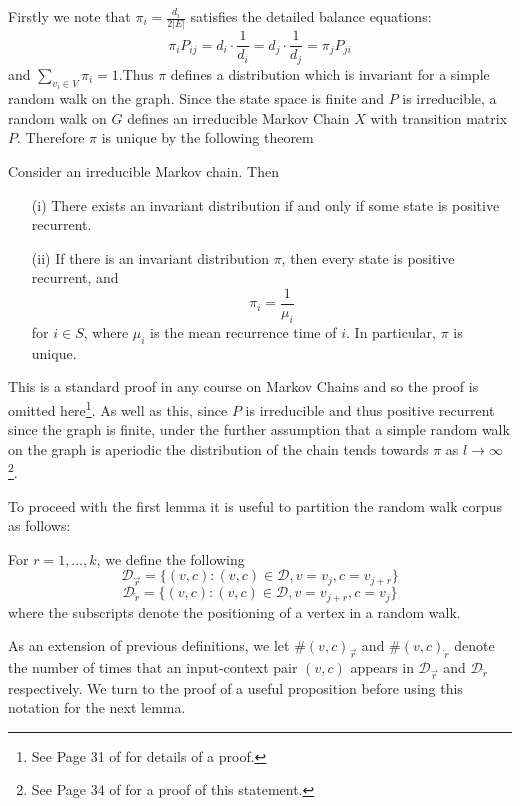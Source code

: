 \documentclass[a4paper]{article}
\newcommand{\D}{\mathcal D}
\newcommand{\rar}{\overrightarrow r}
\newcommand{\lar}{\overleftarrow r}
\begin{document}
Firstly we note that $\pi_i = \frac{d_i}{2|E|}$ satisfies the detailed balance equations:
\[\pi_i P_{ij} = d_i\cdot \frac{1}{d_i} = d_j \cdot \frac{1}{d_j} = \pi_j P_{ji}\]
and $\sum_{v_i \in V} \pi_i = 1$.Thus $\pi$ defines a distribution which is
invariant for a simple random walk on the graph. Since the state space is
finite and $P$ is irreducible, a random walk on $G$ defines an
irreducible Markov Chain $X$ with transition matrix $P$. Therefore $\pi$ is
unique by the following theorem
\begin{theorem}
  Consider an irreducible Markov chain. Then
  \begin{itemize}
  \item[(i)] There exists an invariant distribution if and only if some state is
    positive recurrent.
  \item[(ii)] If there is an invariant distribution $\pi$, then every state is
    positive recurrent, and
    \[\pi_i = \frac{1}{\mu_i}\]
    for $i \in S$, where $\mu_i$ is the mean recurrence time of $i$. In
    particular, $\pi$ is unique.
  \end{itemize}
\end{theorem}
This is a standard proof in any course on Markov Chains and so the proof is
omitted here\footnote{See Page 31 of \cite{markov_chains} for details of a proof.}. As
well as this, since $P$ is irreducible and thus positive recurrent since the
graph is finite, under the further assumption that a simple random walk on the
graph is aperiodic the distribution of the chain tends towards $\pi$ as
$l \to \infty$\footnote{See Page 34 of \cite{markov_chains} for a proof of this statement.}.

To proceed with the first lemma it is useful to partition the random walk corpus as follows:
\begin{definition}
  For $r = 1, \dots, k$, we define the following
  \[\D_{\rar} = \{ (v, c) : (v, c) \in \D, v = v_j, c = v_{j+r}\}\]
  \[\D_{\lar} = \{ (v, c) : (v, c) \in \D, v = v_{j+r}, c = v_{j}\}\]
  where the subscripts denote the positioning of a vertex in a random walk.
\end{definition}
As an extension of previous definitions, we let $\#(v, c)_{\rar}$ and $\#(v,
c)_{\lar}$ denote the number of times that an input-context pair $(v,c)$ appears
in $\D_{\rar}$ and $\D_{\lar}$ respectively. We turn to the proof of a useful proposition before using this
notation for the next lemma.
\end{document}
